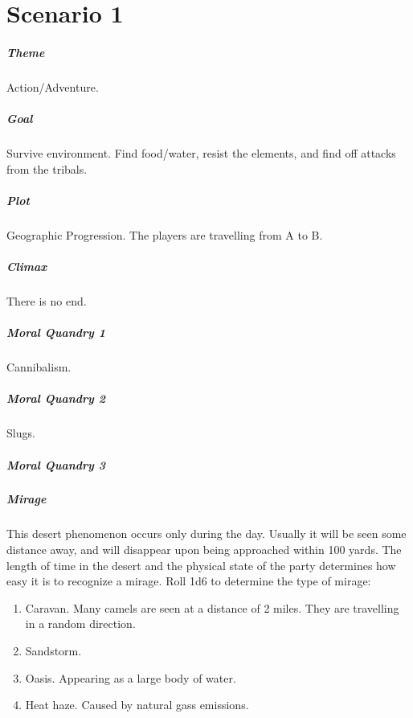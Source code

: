 \chapter{Scenario 1}

\paragraph{Theme} Action/Adventure.
\paragraph{Goal} Survive environment. Find food/water, resist the elements, and find off attacks from the tribals.
\paragraph{Plot} Geographic Progression. The players are travelling from A to B. 
\paragraph{Climax} There is no end. 
\paragraph{Moral Quandry 1} Cannibalism.
\paragraph{Moral Quandry 2} Slugs.
\paragraph{Moral Quandry 3}  


\paragraph{Mirage} This desert phenomenon occurs only during the day. Usually it will be seen some distance away, and will disappear upon being approached within 100 yards. The length of time in the desert and the physical state of the party determines how easy it is to recognize a mirage. Roll 1d6 to determine the type of mirage:
\begin{enumerate}
    \item Caravan. Many camels are seen at a distance of 2 miles. They are travelling in a random direction.
    \item Sandstorm. 
    \item Oasis. Appearing as a large body of water.
    \item Heat haze. Caused by natural gass emissions. 
\end{enumerate}

